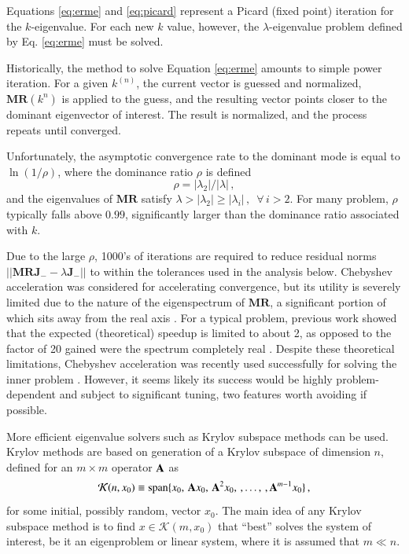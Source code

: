 Equations \ref{eq:erme} and \ref{eq:picard} represent
a Picard (fixed point) iteration
for the $k$-eigenvalue.  For each new $k$ value, however, the 
$\lambda$-eigenvalue problem defined by Eq. \ref{eq:erme} must be 
solved.

Historically, the method to solve Equation \ref{eq:erme} amounts to 
simple power iteration.
For a given $k^{(n)}$, the current vector is guessed and normalized, 
$\mathbf{MR}(k^{n})$ is applied to the guess, and the resulting vector 
points closer to the dominant eigenvector of interest.  The result 
is normalized, and the process repeats until converged. 

Unfortunately, the asymptotic convergence rate to the dominant mode is 
equal to $\ln{(1/\rho)}$, where the dominance ratio $\rho$  is defined
\begin{equation}
 \rho = |\lambda_2| / |\lambda| \, ,
\end{equation}
and the eigenvalues of 
$\mathbf{M}\mathbf{R}$ satisfy 
$\lambda > |\lambda_2| \geq |\lambda_i| \, , \,\,\, \forall \, i > 2$.  
For many problem, $\rho$ typically falls 
above $0.99$, significantly larger than the dominance ratio associated 
with $k$.

Due to the large $\rho$, 1000's of iterations are required to reduce 
residual norms $||\mathbf{MRJ}_- - \lambda \mathbf{J}_-||$ to within the
tolerances used in the analysis below.  
Chebyshev acceleration 
was considered for accelerating convergence, but its utility is severely 
limited due to the nature of the eigenspectrum of $\mathbf{MR}$, a 
significant portion of which sits away from the real axis .  
For a typical problem, previous work 
showed that the expected (theoretical) speedup is limited to 
about 2, as opposed to the factor of 20 gained were the spectrum 
completely real \cite{roberts2012ksi}.
Despite these theoretical limitations, 
Chebyshev acceleration was recently used successfully for solving the inner 
problem \cite{zhang2012ehs}.  However, it seems likely its success would 
be highly problem-dependent and subject to significant tuning, two 
features worth avoiding if possible.

More efficient eigenvalue solvers such as Krylov subspace 
methods can be used.  Krylov methods are based on generation
of a Krylov subspace of dimension $n$, 
defined for an $m \times m$ operator $\mathbf{A}$ as
\begin{equation}
 \mathcal{K}(n,x_0) \equiv \text{span} 
     \{x_0,\, \mathbf{A}x_0,\, \mathbf{A}^2x_0,\, 
         ,\ldots,\,, \mathbf{A}^{m-1}x_0 \} \, , 
 \label{eq:krylovsubspace}
\end{equation}
for some initial, possibly random, vector $x_0$.  The main idea of any Krylov
subspace method is to find  $x \in \mathcal{K}(m,x_0)$  
 that ``best'' solves the system of interest, be it an 
eigenproblem or linear system, where it is assumed that $m \ll n$.

